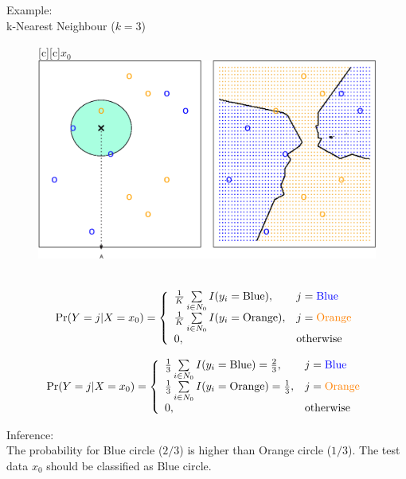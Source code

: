     \documentclass[12pt,fleqn,a4paper]{article}
\theoremstyle{definition}
\theoremstyle{plain}
\begin{document}
\begin{framed}
Example: \\
k-Nearest Neighbour ($k=3$)

\begin{figure}[H]
\centering
{}[c][c]{$x_{0}$}
\includegraphics[scale=0.5]{images//2_14.eps}
\\~\\
\end{figure}

\begin{gather}
{\rm Pr}(Y=j|X=x_{0}) = \left\{
\begin{array}{ll}
\frac{1}{K}\sum\limits_{i \in N_{0}}I(y_{i}=\mbox{Blue}), & j = \mbox{\color{blue}Blue}\\
\frac{1}{K}\sum\limits_{i \in N_{0}}I(y_{i}=\mbox{Orange}), & j = \mbox{\color{orange}Orange}\\
0, & \mbox{otherwise}
\end{array} \right.
\end{gather}

\begin{gather}
{\rm Pr}(Y=j|X=x_{0}) = \left\{
\begin{array}{ll}
\frac{1}{3}\sum\limits_{i \in N_{0}}I(y_{i}=\mbox{Blue}) = \frac{2}{3}, & j = \mbox{\color{blue}Blue}\\
\frac{1}{3}\sum\limits_{i \in N_{0}}I(y_{i}=\mbox{Orange})= \frac{1}{3}, & j = \mbox{\color{orange}Orange}\\
0, & \mbox{otherwise} \\
\end{array} \right.
\end{gather}

Inference: \\
The probability for Blue circle ($2/3$) is higher than Orange circle ($1/3$). The test data $x_{0}$ should be classified as  Blue circle.

\end{framed}
\end{document}
